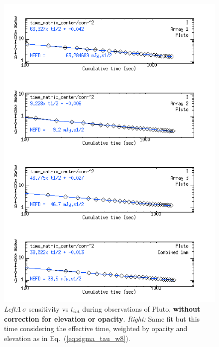\begin{figure}[htpb]
\begin{center}
\includegraphics[clip, angle=0, scale=0.4]{Figures/Pluto_8_sigma_vs_time_matrix_center_tau_w8.png}
\caption[Noise decrease with the integration time]{\emph{Left:}$1\,\sigma$ sensitivity vs $t_{int}$ during observations of Pluto, {\bf
  without correction for elevation or opacity}. \emph{Right:} Same fit but this
  time considering the effective time, weighted by opacity and elevation as in Eq.~(\ref{eq:sigma_tau_w8}).}
\label{fig:Pluto_8_sigma_vs_time_matrix_center}
\end{center}
\end{figure}


